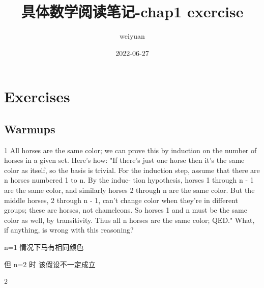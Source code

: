 
\title{具体数学阅读笔记-chap1 exercise}
\author{weiyuan}
\date{2022-06-27}

\maketitle

\section{Exercises}
\subsection{Warmups}

\begin{exercise}1
	All horses are the same color; we can prove this by induction on the
	number of horses in a given set. Here's how: "If there's just one horse
	then it's the same color as itself, so the basis is trivial. For the induction
	step, assume that there are n horses numbered 1 to n. By the induc-
	tion hypothesis, horses 1 through n - 1 are the same color, and similarly
	horses 2 through n are the same color. But the middle horses, 2 through
	n - 1, can't change color when they're in different groups; these are
	horses, not chameleons. So horses 1 and n must be the same color as
	well, by transitivity. Thus all n horses are the same color; QED." What,
	if anything, is wrong with this reasoning?
\end{exercise}

\begin{answer}
	n=1 情况下马有相同颜色
	
	但 n=2 时	该假设不一定成立
\end{answer}


\begin{exercise}2
\end{exercise}

